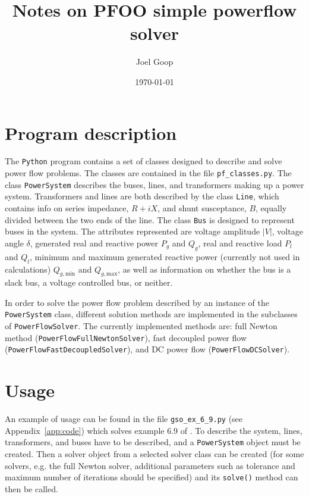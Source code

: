 \documentclass[11pt,a4paper,notitlepage]{article}
\newcommand{\doctitlepdf}{Notes on PFOO simple powerflow solver}
\newcommand{\doctitle}{\doctitlepdf}
\newcommand{\docauthor}{Joel Goop}
\begin{document}

\setcounter{page}{1}

\title{\doctitle}
\author{\docauthor}
\date{\today}
\maketitle

\setdefaulthdr
{}
\setcounter{page}{1}

\section{Program description} %
\label{sec:program_description}
The \texttt{Python} program contains a set of classes designed to describe and solve power flow problems. The classes are contained in the file \texttt{pf\_classes.py}. The class \texttt{PowerSystem} describes the buses, lines, and transformers making up a power system. Transformers and lines are both described by the class \texttt{Line}, which contains info on series impedance, $R+iX$, and shunt susceptance, $B$, equally divided between the two ends of the line. The class \texttt{Bus} is designed to represent buses in the system. The attributes represented are voltage amplitude $|V|$, voltage angle $\delta$, generated real and reactive power $P_g$ and $Q_g$, real and reactive load $P_l$ and $Q_l$, minimum and maximum generated reactive power (currently not used in calculations) $Q_{g,\text{min}}$ and $Q_{g,\text{max}}$, as well as information on whether the bus is a slack bus, a voltage controlled bus, or neither.

In order to solve the power flow problem described by an instance of the \texttt{PowerSystem} class, different solution methods are implemented in the subclasses of \texttt{PowerFlowSolver}. The currently implemented methods are: full Newton method (\texttt{Power\-Flow\-Full\-Newton\-Solver}), fast decoupled power flow (\texttt{Power\-Flow\-Fast\-Decoupled\-Solver}), and DC power flow (\texttt{Power\-FlowDCSolver}).

\section{Usage} %
\label{sec:usage}
An example of usage can be found in the file \texttt{gso\_ex\_6\_9.py} (see Appendix~\ref{app:code}) which solves example 6.9 of \citep{glo2012}. To describe the system, lines, transformers, and buses have to be described, and a \texttt{PowerSystem} object must be created. Then a solver object from a selected solver class can be created (for some solvers, e.g. the full Newton solver, additional parameters such as tolerance and maximum number of iterations should be specified) and its \texttt{solve()} method can then be called.
\end{document}
